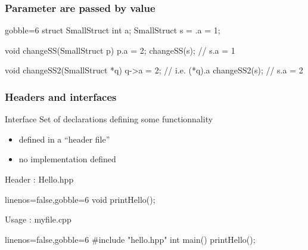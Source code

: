 \begin{frame}[fragile]
  \frametitle{Parameter are passed by value}
  \begin{multicols}{2}
    \begin{cppcode*}{gobble=6}
      struct SmallStruct {int a};
      SmallStruct s = {.a = 1};
      
      void changeSS(SmallStruct p) {
        p.a = 2;
      }
      changeSS(s);
      // s.a = 1
      
      void changeSS2(SmallStruct *q) {
        q->a = 2;  // i.e. (*q).a
      }
      changeSS2(s);
      // s.a = 2
    \end{cppcode*}
    \columnbreak
    \null \vfill
    \vfill \null
  \end{multicols}
\end{frame}

\begin{frame}[fragile,label=current]
  \frametitle{Headers and interfaces}
  \begin{block}{Interface}
    Set of declarations defining some functionnality
    \begin{itemize}
    \item defined in a ``header file''
    \item no implementation defined
    \end{itemize}
  \end{block}
  \begin{block}{Header : Hello.hpp}
    \begin{cppcode*}{linenos=false,gobble=6}
      void printHello();
    \end{cppcode*}
  \end{block}
  \begin{block}{Usage : myfile.cpp}
    \begin{cppcode*}{linenos=false,gobble=6}
      #include "hello.hpp"
      int main() {
        printHello();
      }
    \end{cppcode*}  
  \end{block}
\end{frame}

